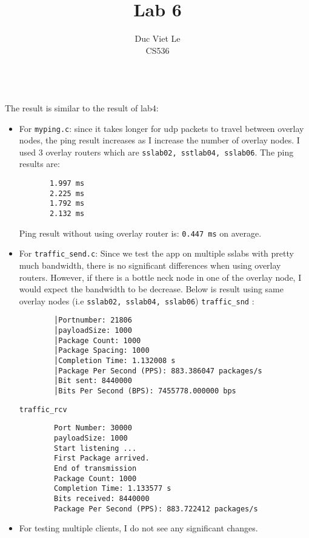 \documentclass[12pt]{article}
\newenvironment{problem}[2][Problem]{\begin{trivlist}
\item[\hskip \labelsep {\bfseries #1}\hskip \labelsep {\bfseries #2.}]}{\end{trivlist}}
\begin{document}
 
\title{Lab 6}
\author{Duc Viet Le\\
 CS536}
 
\maketitle
 
\begin{problem}{1} \ \\
The result is similar to the result of lab4:
\begin{itemize}
    \item For \texttt{myping.c}: since it takes longer for udp packets to travel between overlay nodes, the ping result increases as I increase the number of overlay nodes. I used 3 overlay routers which are \texttt{sslab02, sstlab04, sslab06}. The ping results are:
    \begin{verbatim}
       1.997 ms 
       2.225 ms
       1.792 ms
       2.132 ms 
    \end{verbatim}
    Ping result without using overlay router is: \texttt{0.447 ms} on average.
    \item For \texttt{traffic\_send.c}: Since we test the app on multiple sslabs with pretty much bandwidth, there is no significant differences when using overlay routers. However, if there is a bottle neck node in one of the overlay node, I would expect the bandwidth to be decrease. Below is result using same overlay nodes (i.e \texttt{sslab02, sslab04, sslab06})
    \texttt{traffic\_snd} :
    \begin{verbatim}
        │Portnumber: 21806
        │payloadSize: 1000
        │Package Count: 1000
        │Package Spacing: 1000
        │Completion Time: 1.132008 s
        │Package Per Second (PPS): 883.386047 packages/s
        │Bit sent: 8440000
        │Bits Per Second (BPS): 7455778.000000 bps 
    \end{verbatim}
    \texttt{traffic\_rcv}
    \begin{verbatim}
        Port Number: 30000
        payloadSize: 1000
        Start listening ... 
        First Package arrived.
        End of transmission
        Package Count: 1000
        Completion Time: 1.133577 s
        Bits received: 8440000
        Package Per Second (PPS): 883.722412 packages/s
    \end{verbatim}
    \item For testing multiple clients, I do not see any significant changes. 
\end{itemize}

\end{problem}

\begin{problem}{2}
    
\end{problem}
\end{document}
